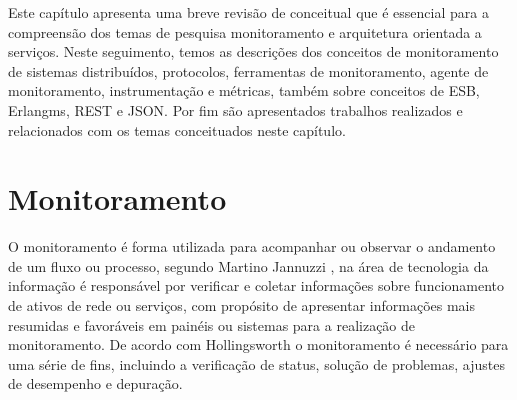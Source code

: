 \label{fundamentacao_teorica}


\newcommand{\texCommand}[1]{\texttt{\textbackslash{#1}}}%

\newcommand{\exemplo}[1]{%
\vspace{\baselineskip}%
\noindent\fbox{\begin{minipage}{\textwidth}#1\end{minipage}}%
\\\vspace{\baselineskip}}%

\newcommand{\exemploVerbatim}[1]{%
\vspace{\baselineskip}%
\noindent\fbox{\begin{minipage}{\textwidth}%
#1\end{minipage}}%
\\\vspace{\baselineskip}}%


Este capítulo apresenta uma breve revisão de conceitual que é essencial para a compreensão dos temas de pesquisa monitoramento e arquitetura orientada a serviços. Neste seguimento, temos as descrições dos conceitos de monitoramento de sistemas distribuídos, protocolos, ferramentas de monitoramento, agente de monitoramento, instrumentação e métricas, também sobre conceitos de \acrshort{ESB}, Erlangms, \acrshort{REST} e \acrshort{JSON}. Por fim são apresentados trabalhos realizados e relacionados com os temas conceituados neste capítulo.  



\section{Monitoramento}

O monitoramento é forma utilizada para acompanhar ou observar o andamento de um fluxo ou processo, segundo Martino Jannuzzi \cite{de2014indicadores}, na área de tecnologia da informação é responsável por verificar e coletar informações sobre funcionamento de ativos de rede ou serviços, com propósito de apresentar informações mais resumidas e favoráveis em painéis ou sistemas para a realização de monitoramento. De acordo com Hollingsworth \cite{hollingsworth2003instrumentation} o monitoramento é necessário para uma série de fins, incluindo a verificação de status, solução de problemas, ajustes de desempenho e depuração. 

